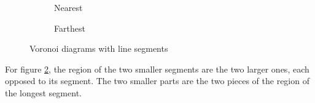 \documentclass[11pt,a4paper,english]{article}
\begin{document}
	\begin{figure}[h]
    \centering
    \begin{subfigure}[b]{0.45\textwidth}
        \caption{Nearest\label{fig:SVD_example}}
    \end{subfigure}
	\qquad
    \begin{subfigure}[b]{0.45\textwidth}
        \caption{Farthest\label{fig:FSVD_example}}
    \end{subfigure}
    \caption{Voronoi diagrams with line segments\label{fig:examples}}
	\end{figure}
	
	For figure \ref{fig:FSVD_example}, the region of the two smaller segments are the two larger ones, each opposed to its segment. The two smaller parts are the two pieces of the region of the longest segment.
	
\end{document}
